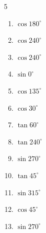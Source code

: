 \begin{multicols}{5}
\begin{enumerate}
  \item $\displaystyle \cos{180^\circ}$

        \phantom{$\displaystyle =-1$}

  \item $\displaystyle \cos{240^\circ}$


  \item $\displaystyle \cos{240^\circ}$


  \item $\displaystyle \sin{0^\circ}$

        \phantom{$\displaystyle =0$}

  \item $\displaystyle \cos{135^\circ}$


  \item $\displaystyle \cos{30^\circ}$


  \item $\displaystyle \tan{60^\circ}$


  \item $\displaystyle \tan{240^\circ}$


  \item $\displaystyle \sin{270^\circ}$

        \phantom{$\displaystyle =-1$}

  \item $\displaystyle \tan{45^\circ}$

        \phantom{$\displaystyle =1$}

  \item $\displaystyle \sin{315^\circ}$


  \item $\displaystyle \cos{45^\circ}$


  \item $\displaystyle \sin{270^\circ}$


\end{enumerate}
\end{multicols}
